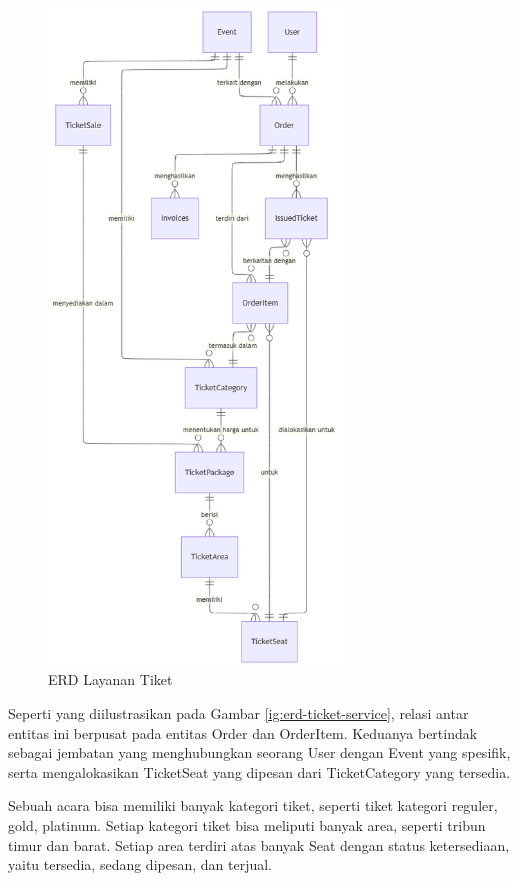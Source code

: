 \begin{figure}[H]
    \centering
    \includegraphics[width=0.7\textwidth]{resources/chapter-3/erd-mini.png}
    \caption{ERD Layanan Tiket}
    \label{fig:erd-ticket-service}
\end{figure}

Seperti yang diilustrasikan pada Gambar \ref{ig:erd-ticket-service}, relasi antar entitas ini berpusat pada entitas Order dan OrderItem. Keduanya bertindak sebagai jembatan yang menghubungkan seorang User dengan Event yang spesifik, serta mengalokasikan TicketSeat yang dipesan dari TicketCategory yang tersedia.

Sebuah acara bisa memiliki banyak kategori tiket, seperti tiket kategori reguler, gold, platinum. Setiap kategori tiket bisa meliputi banyak area, seperti tribun timur dan barat. Setiap area terdiri atas banyak Seat dengan status ketersediaan, yaitu tersedia, sedang dipesan, dan terjual.

